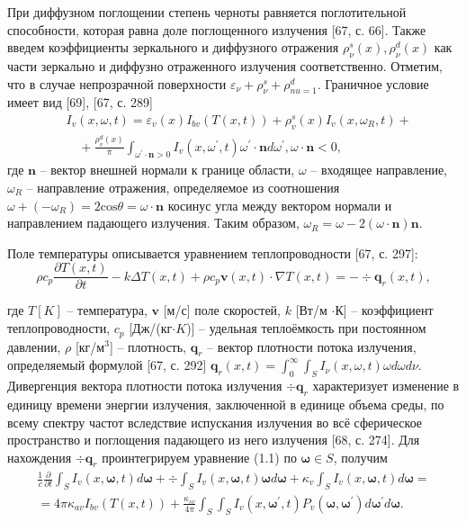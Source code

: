При диффузном поглощении степень черноты равняется
поглотительной способности, которая равна доле поглощенного излучения [67, с. 66].
Также введем коэффициенты зеркального и диффузного отражения
$\rho^s_\nu(x), \rho^d_\nu(x)$ как части зеркально и диффузно отраженного излучения соответственно.
Отметим, что в случае непрозрачной поверхности $\varepsilon_\nu + \rho^s_\nu + \rho^d_{nu = 1}$.
Граничное условие имеет вид [69], [67, с. 289]
\[
    \begin{aligned}
        &I_v(x, \omega, t)=\varepsilon_v(x) I_{b v}(T(x, t))+\rho_v^s(x) I_v\left(x, \omega_R, t\right)+ \\
        &\quad+\frac{\rho_v^d(x)}{\pi} \int_{\omega^{\prime} \cdot \mathbf{n}>0} I_v\left(x, \omega^{\prime},
        t\right) \omega^{\prime} \cdot \mathbf{n} d \omega^{\prime}, \omega \cdot \mathbf{n}<0,
    \end{aligned}
\]
где $\mathbf{n}$ -- вектор внешней нормали к границе области, $\omega$ -- входящее направление,
$\omega_R$ -- направление отражения, определяемое из соотношения
$\omega + (-\omega_R) = 2 \text{cos}\theta = \omega \cdot \mathbf{n}$ косинус угла между
вектором нормали и направлением падающего излучения.
Таким образом, $\omega_R = \omega -2(\omega \cdot \mathbf{n})\mathbf{n}$.


Поле температуры описывается уравнением теплопроводности [67, с. 297]:
\[
    \rho c_p \frac{\partial T(x, t)}{\partial t}-k \Delta T(x, t)+\rho c_p
    \mathbf{v}(x, t) \cdot \nabla T(x, t)=-\div \mathbf{q}_r(x, t),
\]

где $T[K]$ -- температура, $\mathbf{v}$ [м/с] поле скоростей, $k$ [Вт/м $\cdot К$]
-- коэффициент теплопроводности, $c_p$ [Дж/(кг$\cdot K$)] -- удельная теплоёмкость при постоянном
давлении, $\rho$ [кг/$\text{м}^3$] -- плотность,
$\mathbf{q}_r$ -- вектор плотности потока излучения, определяемый формулой [67, с. 292]
$\mathbf{q}_r(x, t) = \int^\infty_0\int_S I_\nu(x,\omega,t)\omega d\omega d\nu$.
Дивергенция вектора плотности потока излучения $\div \mathbf{q}_r$
характеризует изменение в единицу времени энергии излучения,
заключенной в единице объема среды, по всему спектру частот вследствие испускания
излучения во всё сферическое пространство и поглощения падающего из него излучения [68, с. 274].
Для нахождения $\div \mathbf{q}_{r}$ проинтегрируем уравнение (1.1) по $\boldsymbol{\omega} \in S$, получим
\[
    \begin{gathered}
        \frac{1}{c} \frac{\partial}{\partial t} \int_{S} I_{v}(x, \boldsymbol{\omega}, t) d
        \boldsymbol{\omega}+\div \int_{S} I_{v}(x, \boldsymbol{\omega}, t) \boldsymbol{\omega} d
        \boldsymbol{\omega}+\kappa_{v} \int_{S} I_{v}(x, \boldsymbol{\omega}, t) d \boldsymbol{\omega}= \\
        =4 \pi \kappa_{a v} I_{b v}(T(x, t))+\frac{\kappa_{s v}}{4 \pi} \int_{S}
        \int_{S} I_{v}\left(x, \boldsymbol{\omega}^{\prime}, t\right) P_{v}\left(\boldsymbol{\omega},
        \boldsymbol{\omega}^{\prime}\right) d \boldsymbol{\omega}^{\prime} d \boldsymbol{\omega}.
    \end{gathered}
\]


